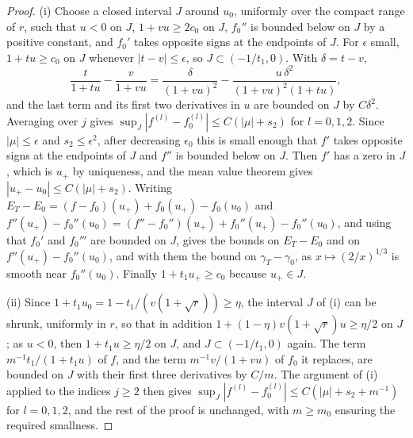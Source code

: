\documentclass[11pt]{amsart}
\theoremstyle{remark}
\numberwithin{equation}{section}
\begin{document}
\begin{proof}
(i) Choose a closed interval $J$ around $u_0$, uniformly over the compact range of $r$, such that $u<0$ on $J$, $1+vu\ge2c_0$ on $J$, $f_0''$ is bounded below on $J$ by a positive constant, and $f_0'$ takes opposite signs at the endpoints of $J$. For $\epsilon$ small, $1+tu\ge c_0$ on $J$ whenever $|t-v|\le\epsilon$, so $J\subset(-1/t_1,0)$. With $\delta=t-v$,
\[
\frac{t}{1+tu}-\frac{v}{1+vu}=\frac{\delta}{(1+vu)^2}-\frac{u\,\delta^2}{(1+vu)^2(1+tu)},
\]
and the last term and its first two derivatives in $u$ are bounded on $J$ by $C\delta^2$. Averaging over $j$ gives $\sup_J|f^{(l)}-f_0^{(l)}|\le C(|\mu|+s_2)$ for $l=0,1,2$. Since $|\mu|\le\epsilon$ and $s_2\le\epsilon^2$, after decreasing $\epsilon_0$ this is small enough that $f'$ takes opposite signs at the endpoints of $J$ and $f''$ is bounded below on $J$. Then $f'$ has a zero in $J$, which is $u_+$ by uniqueness, and the mean value theorem gives $|u_+-u_0|\le C(|\mu|+s_2)$. Writing $E_T-E_0=(f-f_0)(u_+)+f_0(u_+)-f_0(u_0)$ and $f''(u_+)-f_0''(u_0)=(f''-f_0'')(u_+)+f_0''(u_+)-f_0''(u_0)$, and using that $f_0'$ and $f_0'''$ are bounded on $J$, gives the bounds on $E_T-E_0$ and on $f''(u_+)-f_0''(u_0)$, and with them the bound on $\gamma_T-\gamma_0$, as $x\mapsto(2/x)^{1/3}$ is smooth near $f_0''(u_0)$. Finally $1+t_1u_+\ge c_0$ because $u_+\in J$.

(ii) Since $1+t_1u_0=1-t_1/(v(1+\sqrt r))\ge\eta$, the interval $J$ of (i) can be shrunk, uniformly in $r$, so that in addition $1+(1-\eta)v(1+\sqrt r)u\ge\eta/2$ on $J$; as $u<0$, then $1+t_1u\ge\eta/2$ on $J$, and $J\subset(-1/t_1,0)$ again. The term $m^{-1}t_1/(1+t_1u)$ of $f$, and the term $m^{-1}v/(1+vu)$ of $f_0$ it replaces, are bounded on $J$ with their first three derivatives by $C/m$. The argument of (i) applied to the indices $j\ge2$ then gives $\sup_J|f^{(l)}-f_0^{(l)}|\le C(|\mu|+s_2+m^{-1})$ for $l=0,1,2$, and the rest of the proof is unchanged, with $m\ge m_0$ ensuring the required smallness.
\end{proof}
\end{document}
